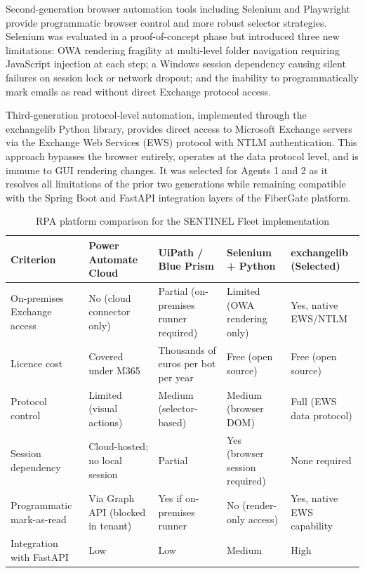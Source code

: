 Second-generation browser automation tools including Selenium and Playwright provide programmatic browser control and more robust selector strategies. Selenium was evaluated in a proof-of-concept phase but introduced three new limitations: OWA rendering fragility at multi-level folder navigation requiring JavaScript injection at each step; a Windows session dependency causing silent failures on session lock or network dropout; and the inability to programmatically mark emails as read without direct Exchange protocol access.

Third-generation protocol-level automation, implemented through the exchangelib Python library, provides direct access to Microsoft Exchange servers via the Exchange Web Services (EWS) protocol with NTLM authentication. This approach bypasses the browser entirely, operates at the data protocol level, and is immune to GUI rendering changes. It was selected for Agents 1 and 2 as it resolves all limitations of the prior two generations while remaining compatible with the Spring Boot and FastAPI integration layers of the FiberGate platform.

\begin{table}[H]
  \centering
  \caption{RPA platform comparison for the SENTINEL Fleet implementation}
  \renewcommand{\arraystretch}{1.0}
  \footnotesize
  \begin{tabularx}{\textwidth}{|X|X|X|X|X|}
    \hline
    \textbf{Criterion} & \textbf{Power Automate Cloud} & \textbf{UiPath / Blue Prism} & \textbf{Selenium + Python} & \textbf{exchangelib (Selected)} \\ \hline
    On-premises Exchange access & No (cloud connector only) & Partial (on-premises runner required) & Limited (OWA rendering only) & Yes, native EWS/NTLM \\ \hline
    Licence cost & Covered under M365 & Thousands of euros per bot per year & Free (open source) & Free (open source) \\ \hline
    Protocol control & Limited (visual actions) & Medium (selector-based) & Medium (browser DOM) & Full (EWS data protocol) \\ \hline
    Session dependency & Cloud-hosted; no local session & Partial & Yes (browser session required) & None required \\ \hline
    Programmatic mark-as-read & Via Graph API (blocked in tenant) & Yes if on-premises runner & No (render-only access) & Yes, native EWS capability \\ \hline
    Integration with FastAPI & Low & Low & Medium & High \\ \hline
  \end{tabularx}
\end{table}

